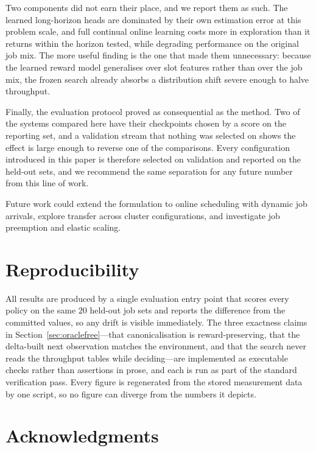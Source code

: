 \documentclass{article}
\begin{document}
Two components did not earn their place, and we report them as such. The learned
long-horizon heads are dominated by their own estimation error at this problem
scale, and full continual online learning costs more in exploration than it returns
within the horizon tested, while degrading performance on the original job mix. The
more useful finding is the one that made them unnecessary: because the learned
reward model generalises over slot features rather than over the job mix, the
frozen search already absorbs a distribution shift severe enough to halve
throughput.

Finally, the evaluation protocol proved as consequential as the method. Two of the
systems compared here have their checkpoints chosen by a score on the reporting
set, and a validation stream that nothing was selected on shows the effect is
large enough to reverse one of the comparisons. Every configuration introduced in
this paper is therefore selected on validation and reported on the held-out sets,
and we recommend the same separation for any future number from this line of
work.

Future work could extend the formulation to online scheduling with dynamic job
arrivals, explore transfer across cluster configurations, and investigate job
preemption and elastic scaling.

\section*{Reproducibility}

All results are produced by a single evaluation entry point that scores every
policy on the same $20$ held-out job sets and reports the difference from the
committed values, so any drift is visible immediately. The three exactness claims
in Section~\ref{sec:oraclefree}---that canonicalisation is reward-preserving, that
the delta-built next observation matches the environment, and that the search
never reads the throughput tables while deciding---are implemented as executable
checks rather than assertions in prose, and each is run as part of the standard
verification pass. Every figure is regenerated from the stored measurement data by
one script, so no figure can diverge from the numbers it depicts.

\section*{Acknowledgments}



\end{document}
